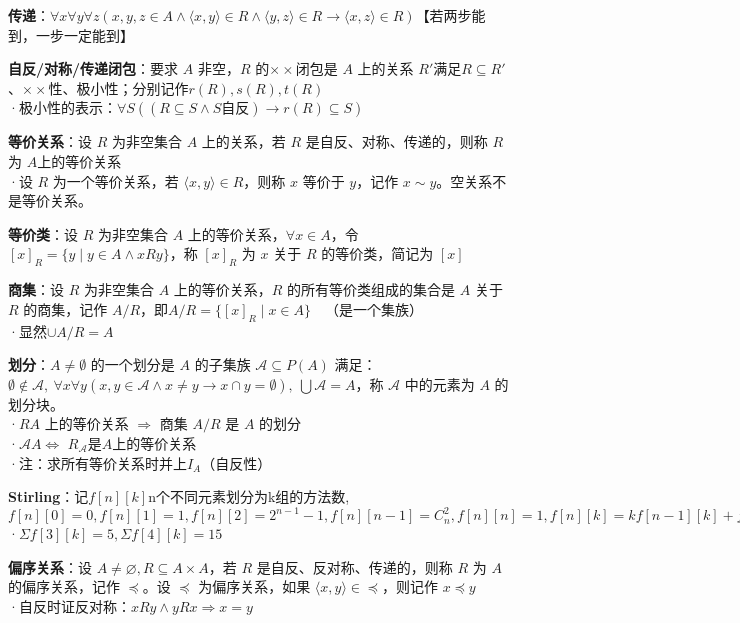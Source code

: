 	\textbf{传递}：$\forall x \forall y \forall z (x, y, z \in A \land \langle x, y \rangle \in R \land \langle y, z \rangle \in R \to \langle x, z \rangle \in R)$【若两步能到，一步一定能到】
	
	\textbf{自反/对称/传递闭包}：要求 $A$ 非空，$R$ 的$××$闭包是 $A$ 上的关系 $R'$满足$R \subseteq R'$、$××$性、极小性；分别记作$r(R), s(R), t(R)$\\
	·极小性的表示：$\forall S ((R \subseteq S \land S \text{自反}) \rightarrow r(R) \subseteq S)$
	
	\textbf{等价关系}：设 $R$ 为非空集合 $A$ 上的关系，若 $R$ 是自反、对称、传递的，则称 $R$ 为 $A \text{上的等价关系}$\\
	·设 $R$ 为一个等价关系，若 $\langle x, y \rangle \in R$，则称 $x$ 等价于 $y$，记作 $x \sim y$。空关系不是等价关系。
	
	\textbf{等价类}：设 $R$ 为非空集合 $A$ 上的等价关系，$\forall x \in A$，令 $[x]_R = \{ y \mid y \in A \land x R y \}$，称 $[x]_R$ 为 $x$ 关于 $R$ 的等价类，简记为 $[x]$
	
	\textbf{商集}：设 $R$ 为非空集合 $A$ 上的等价关系，$R$ 的所有等价类组成的集合是 $A$ 关于 $R$ 的商集，记作 $A/R$，即$A/R = \{ [x]_R \mid x \in A \} \quad \text{（是一个集族）}$\\
	·显然$\cup A/R=A$
	
	\textbf{划分}：$A \neq \emptyset$ 的一个划分是 $A$ 的子集族 $\mathcal{A} \subseteq P(A)$ 满足：$\emptyset \notin \mathcal{A},~ \forall x \forall y (x, y \in \mathcal{A} \land x \neq y \to x \cap y = \emptyset),~ \bigcup \mathcal{A} = A$，称 $\mathcal{A}$ 中的元素为 $A$ 的划分块。\\	
	·$R$$A$ 上的等价关系 $\Rightarrow$ 商集 $A/R$ 是 $A$ 的划分\\
	·$\mathcal{A}$$A$$\Leftrightarrow$ $R_{\mathcal{A}}$是$A$上的等价关系\\	
	·注：求所有等价关系时并上$I_A$（自反性）
	
	\textbf{Stirling}：记$f[n][k]$n个不同元素划分为k组的方法数, $f[n][0]=0, f[n][1]=1, f[n][2]=2^{n-1}-1, f[n][n-1]=C^2_n, f[n][n]=1, f[n][k]=kf[n-1][k]+f[n-1][k-1]$\\
	·$\Sigma f[3][k]=5, \Sigma f[4][k]=15$
	
	\textbf{偏序关系}：设 $A \neq \varnothing, R \subseteq A \times A$，若 $R$ 是自反、反对称、传递的，则称 $R$ 为 $A$ 的偏序关系，记作 $\preccurlyeq$。设 $\preccurlyeq$ 为偏序关系，如果 $\langle x, y \rangle \in \preccurlyeq$，则记作 $x \preccurlyeq y$\\
	·自反时证反对称：$xRy \land yRx \Rightarrow x=y$
	
